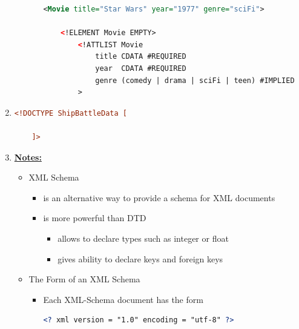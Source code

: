 \documentclass[12pt]{article}
\begin{document}
\begin{enumerate}[1.]
\begin{itemize}
\begin{itemize}
    \begin{lstlisting}[language=XML]
    <Movie title="Star Wars" year="1977" genre="sciFi">

    <!ELEMENT Movie EMPTY>
        <!ATTLIST Movie
            title CDATA #REQUIRED
            year  CDATA #REQUIRED
            genre (comedy | drama | sciFi | teen) #IMPLIED
        >

    \end{lstlisting}
        \end{itemize}
    \end{itemize}

    \item

    \begin{lstlisting}[language=XML]
    <!DOCTYPE ShipBattleData [

    ]>
    \end{lstlisting}

    \item

    \bigskip

    \underline{\textbf{Notes:}}

    \bigskip

    \begin{itemize}
        \item XML Schema
        \begin{itemize}
            \item is an alternative way to provide a schema for XML documents
            \item is more powerful than DTD
            \begin{itemize}
                \item allows to declare types such as integer or float
                \item gives ability to declare keys and foreign keys
            \end{itemize}
        \end{itemize}

        \item The Form of an XML Schema
        \begin{itemize}
            \item Each XML-Schema document has the form

            \bigskip

    \begin{lstlisting}[language=XML]
    <? xml version = "1.0" encoding = "utf-8" ?>


\end{lstlisting}
\end{itemize}
\end{itemize}
\end{enumerate}
\end{document}
